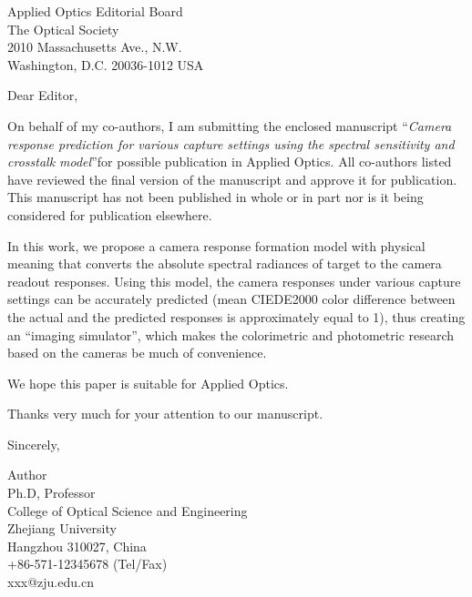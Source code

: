 \documentclass{letter}
\begin{document}
\begin{letter}{Applied Optics Editorial Board\\
The Optical Society\\
2010 Massachusetts Ave., N.W.\\
Washington, D.C. 20036-1012 USA}


\opening{Dear Editor,}

On behalf of my co-authors, I am submitting the enclosed manuscript ``\textit{Camera response prediction for various capture settings using the spectral sensitivity and crosstalk model}''for possible publication in Applied Optics. All co-authors listed have reviewed the final version of the manuscript and approve it for publication. This manuscript has not been published in whole or in part nor is it being considered for publication elsewhere.

In this work, we propose a camera response formation model with physical meaning that converts the absolute spectral radiances of target to the camera readout responses. Using this model, the camera responses under various capture settings can be accurately predicted (mean CIEDE2000 color difference between the actual and the predicted responses is approximately equal to 1), thus creating an ``imaging simulator'', which makes the colorimetric and photometric research based on the cameras be much of convenience.

We hope this paper is suitable for Applied Optics.

Thanks very much for your attention to our manuscript.


\closing{Sincerely,
}

Author\\[.5em]
Ph.D, Professor\\[.1em]
College of Optical Science and Engineering\\[.1em]
Zhejiang University\\[.1em]
Hangzhou 310027, China\\[.5em]
+86-571-12345678 (Tel/Fax)\\[.1em]
xxx@zju.edu.cn\\
\end{letter}
\end{document}
